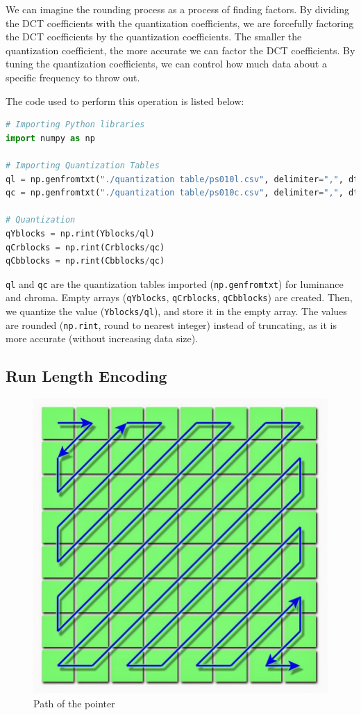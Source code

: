 \documentclass{article}
\begin{document}
We can imagine the rounding process as a process of finding factors.
By dividing the DCT coefficients with the quantization coefficients, we are forcefully factoring the DCT coefficients by the quantization coefficients.
The smaller the quantization coefficient, the more accurate we can factor the DCT coefficients.
By tuning the quantization coefficients, we can control how much data about a specific frequency to throw out.

The code used to perform this operation is listed below:
\begin{lstlisting}[language=Python]
# Importing Python libraries
import numpy as np

# Importing Quantization Tables
ql = np.genfromtxt("./quantization table/ps010l.csv", delimiter=",", dtype=int)
qc = np.genfromtxt("./quantization table/ps010c.csv", delimiter=",", dtype=int)

# Quantization
qYblocks = np.rint(Yblocks/ql)
qCrblocks = np.rint(Crblocks/qc)
qCbblocks = np.rint(Cbblocks/qc)
\end{lstlisting}

\texttt{ql} and \texttt{qc} are the quantization tables imported (\texttt{np.genfromtxt}) for luminance and chroma.
Empty arrays (\texttt{qYblocks}, \texttt{qCrblocks}, \texttt{qCbblocks}) are created.
Then, we quantize the value (\texttt{Yblocks/ql}), and store it in the empty array.
The values are rounded (\texttt{np.rint}, round to nearest integer) instead of truncating, as it is more accurate (without increasing data size).

\subsection{Run Length Encoding}

\begin{figure}
\includegraphics[width=\linewidth]{./figures/zigzag.jpg}
\caption{Path of the pointer~\autocite{dctProcessing}}
\end{figure}
\end{document}
